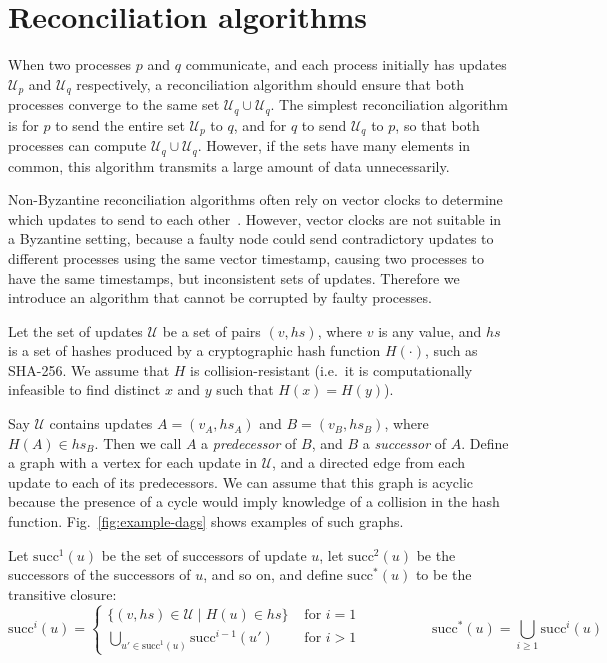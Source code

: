 \documentclass[manuscript,anonymous]{acmart}
\begin{document}
\section{Reconciliation algorithms}\label{sec:algorithm}

When two processes $p$ and $q$ communicate, and each process initially has updates $\mathcal{U}_p$ and $\mathcal{U}_q$ respectively, a reconciliation algorithm should ensure that both processes converge to the same set $\mathcal{U}_q \cup \mathcal{U}_q$.
The simplest reconciliation algorithm is for $p$ to send the entire set $\mathcal{U}_p$ to $q$, and for $q$ to send $\mathcal{U}_q$ to $p$, so that both processes can compute $\mathcal{U}_q \cup \mathcal{U}_q$.
However, if the sets have many elements in common, this algorithm transmits a large amount of data unnecessarily.

Non-Byzantine reconciliation algorithms often rely on vector clocks to determine which updates to send to each other~\cite{Schwarz:1994gl}.
However, vector clocks are not suitable in a Byzantine setting, because a faulty node could send contradictory updates to different processes using the same vector timestamp, causing two processes to have the same timestamps, but inconsistent sets of updates.
Therefore we introduce an algorithm that cannot be corrupted by faulty processes.

Let the set of updates $\mathcal{U}$ be a set of pairs $(v, \mathit{hs})$, where $v$ is any value, and $\mathit{hs}$ is a set of hashes produced by a cryptographic hash function $H(\cdot)$, such as SHA-256.
We assume that $H$ is collision-resistant (i.e.\ it is computationally infeasible to find distinct $x$ and $y$ such that $H(x) = H(y)$).

Say $\mathcal{U}$ contains updates $A = (v_A, \mathit{hs}_A)$ and $B = (v_B, \mathit{hs}_B)$, where $H(A) \in \mathit{hs}_B$.
Then we call $A$ a \emph{predecessor} of $B$, and $B$ a \emph{successor} of $A$.
Define a graph with a vertex for each update in $\mathcal{U}$, and a directed edge from each update to each of its predecessors.
We can assume that this graph is acyclic because the presence of a cycle would imply knowledge of a collision in the hash function.
Fig.~\ref{fig:example-dags} shows examples of such graphs.

Let $\mathrm{succ}^1(u)$ be the set of successors of update $u$, let $\mathrm{succ}^2(u)$ be the successors of the successors of $u$, and so on, and define $\mathrm{succ}^*(u)$ to be the transitive closure:
\[
\mathrm{succ}^i(u) =
\begin{cases}
\{( v, \mathit{hs}) \in \mathcal{U} \mid H(u) \in \mathit{hs}\} & \text{ for } i=1 \\
\bigcup_{u' \in \mathrm{succ}^1(u)} \mathrm{succ}^{i-1}(u') & \text{ for } i>1
\end{cases}
\hspace{60pt}
\mathrm{succ}^*(u) = \bigcup_{i \ge 1} \mathrm{succ}^i(u)
\]
\end{document}
